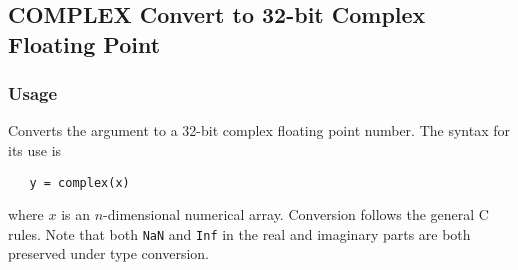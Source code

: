 %
%
%
\subsection{COMPLEX Convert to 32-bit Complex Floating Point}
\subsubsection{Usage}
Converts the argument to a 32-bit complex floating point number.  The syntax
for its use is
\begin{verbatim}
   y = complex(x)
\end{verbatim}
where $x$ is an $n$-dimensional numerical array.  Conversion follows the general C rules.  Note that both \verb|NaN| and \verb|Inf| in the real and imaginary parts are both preserved under type conversion.
